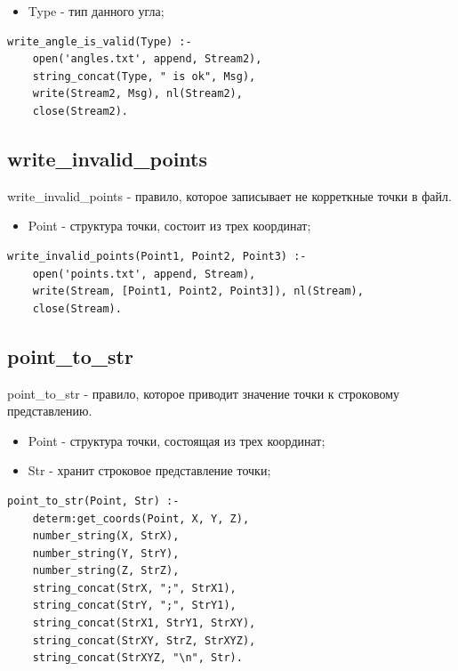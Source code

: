 \begin{itemize}
	\item Type - тип данного угла;
\end{itemize}

\begin{lstlisting}[caption=Реализация правила write\_angle\_is\_valid, label=rules:writeangleisvalid]
write_angle_is_valid(Type) :- 
	open('angles.txt', append, Stream2),
	string_concat(Type, " is ok", Msg),
	write(Stream2, Msg), nl(Stream2),
	close(Stream2).
\end{lstlisting}

\subsection{write\_invalid\_points}
\hspace{0.6cm} write\_invalid\_points - правило, которое записывает не корреткные точки в файл.

\begin{itemize}
	\item Point - структура точки, состоит из трех координат;
\end{itemize}

\begin{lstlisting}[caption=Реализация правила write\_invalid\_points, label=rules:writeinvalidpoints]
write_invalid_points(Point1, Point2, Point3) :-
	open('points.txt', append, Stream),
	write(Stream, [Point1, Point2, Point3]), nl(Stream),
	close(Stream).
\end{lstlisting}

\subsection{point\_to\_str}
\hspace{0.6cm} point\_to\_str - правило, которое приводит значение точки к строковому представлению.

\begin{itemize}
	\item Point - структура точки, состоящая из трех координат;
	\item Str - хранит строковое представление точки;
\end{itemize}

\begin{lstlisting}[caption=Реализация правила point\_to\_str, label=rules:pointtostr]
point_to_str(Point, Str) :-
	determ:get_coords(Point, X, Y, Z),
	number_string(X, StrX),
	number_string(Y, StrY),
	number_string(Z, StrZ),
	string_concat(StrX, ";", StrX1),
	string_concat(StrY, ";", StrY1),
	string_concat(StrX1, StrY1, StrXY),
	string_concat(StrXY, StrZ, StrXYZ),
	string_concat(StrXYZ, "\n", Str).
\end{lstlisting}

